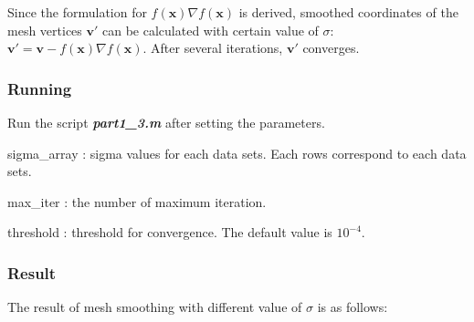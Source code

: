 \documentclass[paper=a4, fontsize=11pt]{scrartcl} %
\numberwithin{equation}{section} %
\numberwithin{figure}{section} %
\numberwithin{table}{section} %
\newcommand{\filename}[1]{\textbf{\textit{#1}}}
\renewcommand{\vec}[1]{\mathbf{#1}}
\begin{document}
Since the formulation for $f(\vec{x}) \nabla f(\vec{x})$ is derived, smoothed coordinates of the mesh vertices $\vec{v'}$ can be calculated with certain value of $\sigma$: $\vec{v'} = \vec{v} - f(\vec{x}) \nabla f(\vec{x})$. After several iterations, $\vec{v'}$ converges. 

\pagebreak

\subsubsection{Running}

Run the script \filename{part1\_3.m} after setting the parameters. 

\begin{paramdescription}
\item [sigma\_array] : sigma values for each data sets. Each rows correspond to each data sets.
\item [max\_iter] : the number of maximum iteration. 
\item [threshold] : threshold for convergence. The default value is $10^{-4}$.
\end{paramdescription}


\subsubsection{Result}

The result of mesh smoothing with different value of $\sigma$ is as follows:
\end{document}
